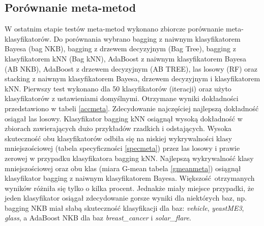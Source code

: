 \subsection{Porównanie meta-metod}
W ostatnim etapie testów meta-metod wykonano zbiorcze porównanie meta-klasyfikatorów. Do porównania wybrano bagging z naiwnym klasyfikatorem Bayesa (bag NKB), bagging z drzewem decyzyjnym (Bag Tree), bagging z klasyfikatorem kNN (Bag kNN), AdaBoost z naiwnym klasyfikatorem Bayesa (AB NKB), AdaBoost z drzewem decyzyjnym (AB TREE), las losowy (RF) oraz stacking z naiwnym klasyfikatorem Bayesa, drzewem decyzyjnym i klasyfikatorem kNN. Pierwszy test wykonano dla 50 klasyfikatorów (iteracji) oraz użyto klasyfikatorów z ustawieniami domyślnymi. Otrzymane wyniki dokładności przedstawiono w tabeli \ref{accmeta}. Zdecydowanie najczęściej najlepszą dokładność osiągał las losowy. Klasyfikator bagging kNN osiągnął wysoką dokładność w zbiorach zawierających dużo przykładów rzadkich i odstających. Wysoka skuteczność obu klasyfikatorów odbiła się na niskiej wykrywalności klasy mniejszościowej (tabela specyficzności \ref{specmeta}) przez las losowy i prawie zerowej w przypadku klasyfikatora bagging kNN. Najlepszą wykrywalność klasy mniejszościowej oraz obu klas (miara G-mean tabela \ref{gmeanmeta}) osiągnął klasyfikator bagging z naiwnym klasyfikatorem Bayesa. Większość otrzymanych wyników różniła się tylko o kilka procent. Jednakże miały miejsce przypadki, że jeden klasyfikator osiągał zdecydowanie gorsze wyniki dla niektórych baz, np. bagging NKB miał słabą skuteczność klasyfikacji dla baz: \textit{vehicle}, \textit{yeastME3}, \textit{glass}, a AdaBoost NKB dla baz \textit{breast\_cancer} i \textit{solar\_flare}.


